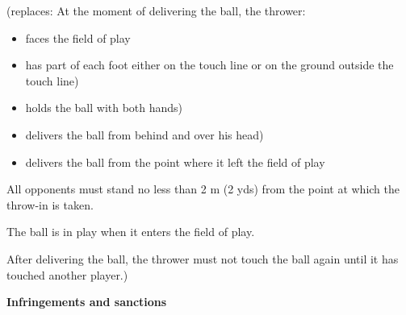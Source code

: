 \bigskip

{\color[rgb]{0.4,0.4,0.4}
(replaces: At the moment of delivering the ball, the thrower:

\begin{itemize}
\item faces the field of play
\item has part of each foot either on the touch line or on the ground outside
the touch line)
\item holds the ball with both hands)
\item delivers the ball from behind and over his head)
\item delivers the ball from the point where it left the field of play
\end{itemize}

\bigskip

All opponents must stand no less than 2 m (2 yds) from the point at
which the throw-in is taken.

\bigskip

The ball is in play when it enters the field of play.

\bigskip

After delivering the ball, the thrower must
not touch the ball again until it has touched another player.)}

\bigskip

{\bfseries Infringements and sanctions}

\headlinebox

